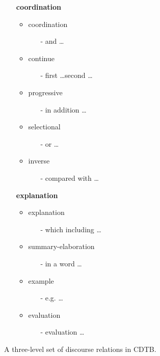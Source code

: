 \begin{figure}[ht]
\begin{multicols}{2}
\begin{itemize}
  \vfill
  \columnbreak

  \item[] \textbf{coordination}
  \begin{itemize}
    \item coordination
    \begin{itemize}
      \item[-] and \ldots
    \end{itemize}
    \item continue
    \begin{itemize}
      \item[-] first \ldots second \ldots
    \end{itemize}
    \item progressive
    \begin{itemize}
      \item[-] in addition \ldots
    \end{itemize}
    \item selectional
    \begin{itemize}
      \item[-] or \ldots
    \end{itemize}
    \item inverse
    \begin{itemize}
      \item[-] compared with \ldots
    \end{itemize}
  \end{itemize}

  \item[] \textbf{explanation}
  \begin{itemize}
    \item explanation
    \begin{itemize}
      \item[-] which including \ldots
    \end{itemize}
    \item summary-elaboration
    \begin{itemize}
      \item[-] in a word \ldots
    \end{itemize}
    \item example
    \begin{itemize}
      \item[-] e.g. \ldots
    \end{itemize}
    \item evaluation
    \begin{itemize}
      \item[-] evaluation \ldots
    \end{itemize}
  \end{itemize}
\end{itemize}
\end{multicols}

\caption{\label{i:three-level} A three-level set of discourse relations in
CDTB. }
\end{figure}

